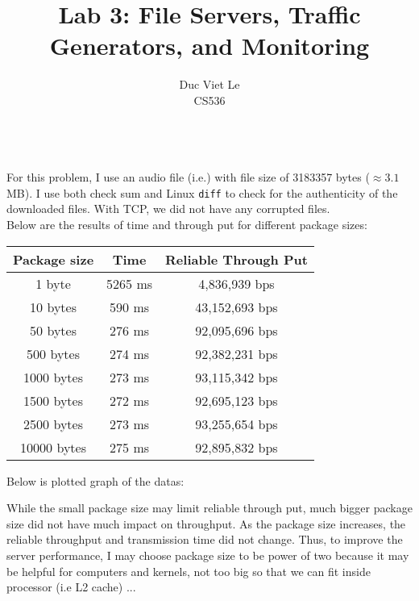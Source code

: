 \documentclass[12pt]{article}
\newenvironment{problem}[2][Problem]{\begin{trivlist}
\item[\hskip \labelsep {\bfseries #1}\hskip \labelsep {\bfseries #2.}]}{\end{trivlist}}
\begin{document}
 
\title{Lab 3: File Servers, Traffic Generators, and Monitoring}
\author{Duc Viet Le\\ 
CS536}
 
\maketitle
 
\begin{problem}{1} \ \\
For this problem, I use an audio file (i.e.) with file size of 3183357 bytes ($\approx 3.1$ MB). I use both check sum and Linux \texttt{diff} to check for the authenticity of the downloaded files. With TCP, we did not have any corrupted files. 
\\
Below are the results of time and through put for different package sizes:
\begin{center}
	\begin{tabular}{|c|c|c|}
	\hline 
	Package size & Time & Reliable Through Put \\ \hline
	1 byte & 5265 ms & 4,836,939 bps \\ \hline
	10 bytes & 590 ms & 43,152,693 bps \\ \hline
	50 bytes & 276 ms & 92,095,696 bps \\ \hline
	500 bytes & 274 ms & 92,382,231 bps \\ \hline
	1000 bytes & 273 ms & 93,115,342 bps \\ \hline
	1500 bytes & 272 ms & 92,695,123 bps \\ \hline
	2500 bytes & 273 ms & 93,255,654 bps \\ \hline
	10000 bytes & 275 ms & 92,895,832 bps \\ \hline
	\end{tabular}
\end{center}
Below is plotted graph of the datas:
\begin{center}
	
\end{center}
While the small package size may limit reliable through put, much bigger package size did not have much impact on throughput. As the package size increases, the reliable throughput and transmission time did not change. Thus, to improve the server performance, I may choose package size to be power of two because it may be helpful for computers and kernels, not too big so that we can fit inside processor (i.e L2 cache) ... 
\end{problem}
\end{document}
